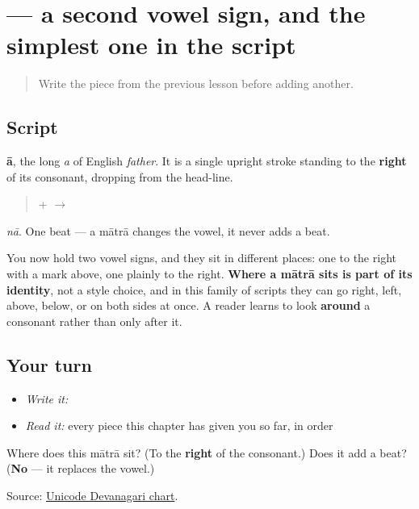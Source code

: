 \section[-ā]{ — a second vowel sign, and the simplest one in the script}

\label{lesson:MR-W01-aa-matra}



\begin{quote}
Write the piece from the previous lesson before adding another.
\end{quote}

\subsection*{Script}
\begin{quote}
\end{quote}

\textbf{ā}, the long \emph{a} of English \emph{father}. It is a single upright stroke standing to the \textbf{right} of its consonant, dropping from the head-line.

\begin{quote}
\textbf{} + \textbf{} $\to$ \textbf{}
\end{quote}

\emph{nā}. One beat — a mātrā changes the vowel, it never adds a beat.

You now hold two vowel signs, and they sit in different places: one to the right with a mark above, one plainly to the right. \textbf{Where a mātrā sits is part of its identity}, not a style choice, and in this family of scripts they can go right, left, above, below, or on both sides at once. A reader learns to look \textbf{around} a consonant rather than only after it.

\subsection*{Your turn}
\begin{itemize}
\raggedright
  \item \emph{Write it:} 
  \item \emph{Read it:} every piece this chapter has given you so far, in order
\end{itemize}

\begin{tcolorbox}[breakable,colback=teal!4,colframe=teal!35!black,title={Before you move on}]
Where does this mātrā sit? (To the \textbf{right} of the consonant.) Does it add a beat? (\textbf{No} — it replaces the vowel.)

Source: \href{https://www.unicode.org/charts/PDF/U0900.pdf}{Unicode Devanagari chart}.
\end{tcolorbox}
